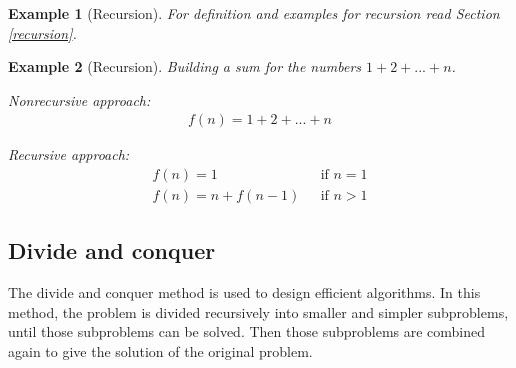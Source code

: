 \documentclass[a4paper, 11pt]{article}
\newtheorem*{example*}{Example}
\begin{document}
\begin{example*}[Recursion]

For definition and examples for recursion read Section \ref{recursion}.

\end{example*}


\begin{example*}[Recursion]
Building a sum for the numbers $1+2+...+n$.

Nonrecursive approach:
\begin{align*}
f(n) = 1+2+...+n
\end{align*}

Recursive approach:
\begin{align*}
f(n) = 1 \ \ \ \ \ \ \ \ \ \ \ \ \ \ \  & \ \ \ \text{if } n=1 \\
f(n) = n + f(n-1) & \ \ \ \text{if } n > 1
\end{align*}

\end{example*}


\subsection{Divide and conquer}
\label{divide_and_conquer}

The divide and conquer method is used to design efficient algorithms. In this method, the problem is divided recursively into smaller and simpler subproblems, until those subproblems can be solved. Then those subproblems are combined again to give the solution of the original problem.
\end{document}
